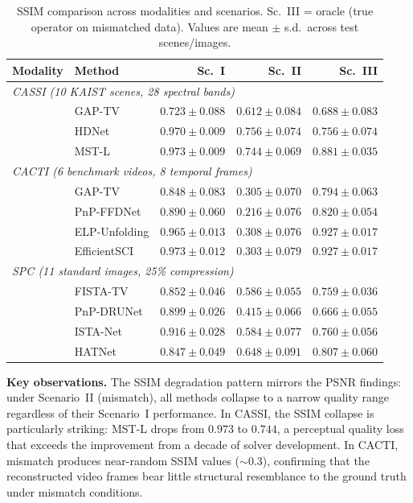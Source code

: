 \documentclass[11pt]{article}
\begin{document}
\begin{table}[htbp]
\centering
\caption{SSIM comparison across modalities and scenarios.
Sc.~III = oracle (true operator on mismatched data).
Values are mean $\pm$ s.d.\ across test scenes/images.}
\label{tab:ssim}
\begin{tabular}{l l r r r}
\toprule
\textbf{Modality} & \textbf{Method} &
  \textbf{Sc.~I} & \textbf{Sc.~II} & \textbf{Sc.~III} \\
\midrule
\multicolumn{5}{l}{\emph{CASSI (10 KAIST scenes, 28 spectral bands)}} \\
\midrule
& GAP-TV   & $0.723 \pm 0.088$ & $0.612 \pm 0.084$ & $0.688 \pm 0.083$ \\
& HDNet    & $0.970 \pm 0.009$ & $0.756 \pm 0.074$ & $0.756 \pm 0.074$ \\
& MST-L    & $0.973 \pm 0.009$ & $0.744 \pm 0.069$ & $0.881 \pm 0.035$ \\
\midrule
\multicolumn{5}{l}{\emph{CACTI (6 benchmark videos, 8 temporal frames)}} \\
\midrule
& GAP-TV        & $0.848 \pm 0.083$ & $0.305 \pm 0.070$ & $0.794 \pm 0.063$ \\
& PnP-FFDNet    & $0.890 \pm 0.060$ & $0.216 \pm 0.076$ & $0.820 \pm 0.054$ \\
& ELP-Unfolding & $0.965 \pm 0.013$ & $0.308 \pm 0.076$ & $0.927 \pm 0.017$ \\
& EfficientSCI  & $0.973 \pm 0.012$ & $0.303 \pm 0.079$ & $0.927 \pm 0.017$ \\
\midrule
\multicolumn{5}{l}{\emph{SPC (11 standard images, 25\% compression)}} \\
\midrule
& FISTA-TV   & $0.852 \pm 0.046$ & $0.586 \pm 0.055$ & $0.759 \pm 0.036$ \\
& PnP-DRUNet & $0.899 \pm 0.026$ & $0.415 \pm 0.066$ & $0.666 \pm 0.055$ \\
& ISTA-Net   & $0.916 \pm 0.028$ & $0.584 \pm 0.077$ & $0.760 \pm 0.056$ \\
& HATNet     & $0.847 \pm 0.049$ & $0.648 \pm 0.091$ & $0.807 \pm 0.060$ \\
\bottomrule
\end{tabular}
\end{table}

\noindent\textbf{Key observations.}
The SSIM degradation pattern mirrors the PSNR findings: under Scenario~II
(mismatch), all methods collapse to a narrow quality range regardless of
their Scenario~I performance. In CASSI, the SSIM collapse is particularly
striking: MST-L drops from $0.973$ to $0.744$, a perceptual quality
loss that exceeds the improvement from a decade of solver development.
In CACTI, mismatch produces near-random SSIM values (${\sim}0.3$),
confirming that the reconstructed video frames bear little structural
resemblance to the ground truth under mismatch conditions.
\end{document}
